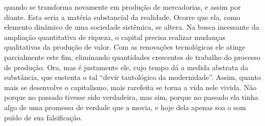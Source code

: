 quando se transforma novamente em produção de mercadorias, e assim por
diante. Esta seria a matéria substancial da realidade. Ocorre que ela,
como elemento dinâmico de uma sociedade sistêmica, se altera. Na busca
incessante da ampliação quantitativa de riqueza, o capital precisa
realizar mudanças qualitativas da produção de valor. Com as renovações
tecnológicas ele atinge parcialmente este fim, eliminando quantidades
crescentes de trabalho do processo de produção. Ora, mas é justamente
ele, cujo tempo dá a medida abstrata da substância, que sustenta o tal
``devir tautológico da modernidade''. Assim, quanto mais se desenvolve o
capitalismo, mais rarefeita se torna a vida nele vivida. Não porque no
passado tivesse sido verdadeira, mas sim, porque no passado ela tinha
algo de uma promessa de verdade que a movia, e hoje dela apenas soa o
som puído de sua falsificação.

